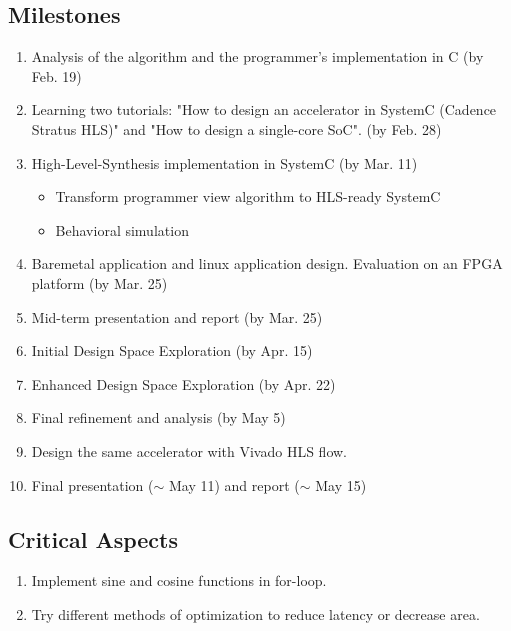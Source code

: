 \documentclass{sig-alternate}
\begin{document}
\subsection{Milestones}\label{sec:arch}
\label{sec:milestones}

\vspace{-0.1in}
\begin{enumerate}
\setlength\itemsep{-0.15em}
  \item Analysis of the algorithm and the programmer's implementation in C (by Feb. 19)
  \item Learning two tutorials: "How to design an accelerator in SystemC (Cadence Stratus HLS)" and "How to design a single-core SoC"\cite{esp1}. (by Feb. 28)
  \item High-Level-Synthesis implementation in SystemC (by Mar. 11)
  \vspace{-2mm}
       \begin{itemize}
            \item Transform programmer view algorithm to HLS-ready SystemC
            \item Behavioral simulation
       \end{itemize}

  \item Baremetal application and linux application design. Evaluation on an FPGA platform (by Mar. 25)
  \item Mid-term presentation and report (by Mar. 25)
  \item Initial Design Space Exploration (by Apr. 15)
  \item Enhanced Design Space Exploration (by Apr. 22)
  \item Final refinement and analysis (by May 5)
  \item Design the same accelerator with Vivado HLS flow.
  \item Final presentation ($\sim$ May 11) and report ($\sim$ May 15)
\end{enumerate}

\subsection{Critical Aspects}
\begin{enumerate}
\setlength\itemsep{-0.15em}
\item Implement sine and cosine functions in for-loop.
\item Try different methods of optimization to reduce latency or decrease area.
\end{enumerate}
\end{document}
